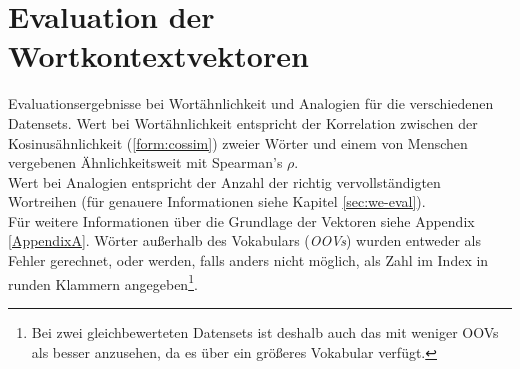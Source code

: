 
\chapter{Evaluation der Wortkontextvektoren} %

\label{AppendixB} %

Evaluationsergebnisse bei Wortähnlichkeit und Analogien für die verschiedenen Datensets.
Wert bei Wortähnlichkeit entspricht der Korrelation zwischen der Kosinusähnlichkeit (\ref{form:cossim}) zweier Wörter und
einem von Menschen vergebenen Ähnlichkeitsweit mit Spearman's $\rho$.\\
Wert bei Analogien entspricht der Anzahl der richtig vervollständigten Wortreihen (für genauere Informationen siehe
Kapitel \ref{sec:we-eval}).\\
Für weitere Informationen über die Grundlage der Vektoren siehe Appendix \ref{AppendixA}.
Wörter außerhalb des Vokabulars (\emph{OOVs}) wurden entweder als Fehler gerechnet, oder
werden, falls anders nicht möglich, als Zahl im Index in runden Klammern angegeben\footnote{Bei zwei gleichbewerteten
Datensets ist deshalb auch das mit weniger OOVs als besser anzusehen, da es über ein größeres Vokabular verfügt.}.


